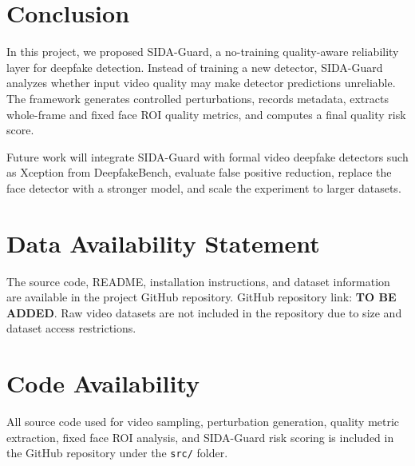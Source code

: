 \documentclass[conference]{IEEEtran}
\begin{document}
\section{Conclusion}
In this project, we proposed SIDA-Guard, a no-training quality-aware reliability layer for deepfake detection. Instead of training a new detector, SIDA-Guard analyzes whether input video quality may make detector predictions unreliable. The framework generates controlled perturbations, records metadata, extracts whole-frame and fixed face ROI quality metrics, and computes a final quality risk score.

Future work will integrate SIDA-Guard with formal video deepfake detectors such as Xception from DeepfakeBench, evaluate false positive reduction, replace the face detector with a stronger model, and scale the experiment to larger datasets.

\section*{Data Availability Statement}
The source code, README, installation instructions, and dataset information are available in the project GitHub repository. GitHub repository link: \textbf{TO BE ADDED}. Raw video datasets are not included in the repository due to size and dataset access restrictions.

\section*{Code Availability}
All source code used for video sampling, perturbation generation, quality metric extraction, fixed face ROI analysis, and SIDA-Guard risk scoring is included in the GitHub repository under the \texttt{src/} folder.



\end{document}
